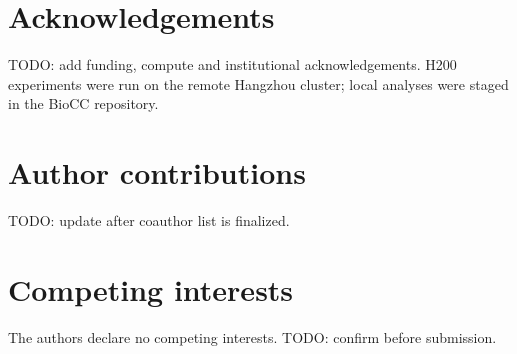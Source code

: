 \documentclass[pdflatex,sn-nature]{sn-jnl}
\begin{document}
\section*{Acknowledgements}

TODO: add funding, compute and institutional acknowledgements. H200 experiments were run on the remote Hangzhou cluster; local analyses were staged in the BioCC repository.

\section*{Author contributions}

TODO: update after coauthor list is finalized.

\section*{Competing interests}

The authors declare no competing interests. TODO: confirm before submission.


\end{document}
